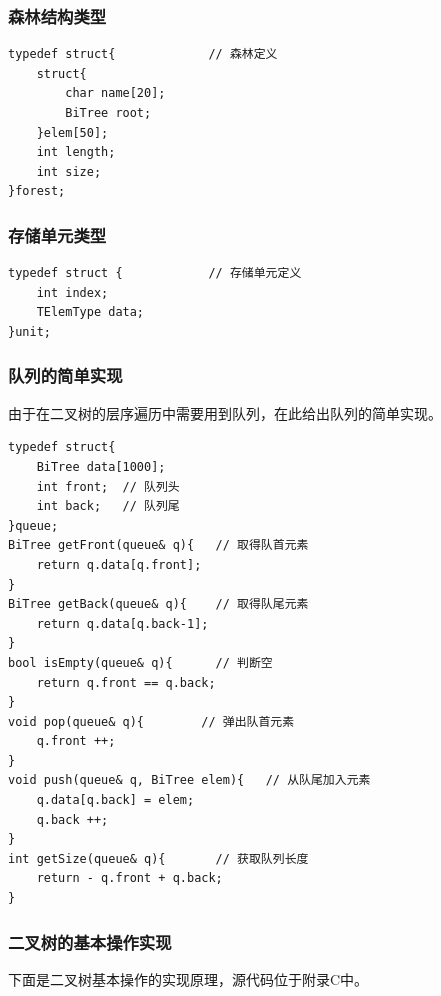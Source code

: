 \documentclass[supercite]{Experimental_Report}
\theoremstyle{definition}
\begin{document}
\subsubsection{森林结构类型}
\begin{verbatim}
typedef struct{         	// 森林定义
    struct{
        char name[20];
        BiTree root;
    }elem[50];
    int length;
    int size;
}forest;
\end{verbatim}

\subsubsection{存储单元类型}
\begin{verbatim}
typedef struct {            // 存储单元定义
    int index;
    TElemType data;
}unit;
\end{verbatim}

\subsubsection{队列的简单实现}
由于在二叉树的层序遍历中需要用到队列，在此给出队列的简单实现。
\begin{verbatim}
typedef struct{
    BiTree data[1000];
    int front;  // 队列头
    int back;   // 队列尾
}queue;
BiTree getFront(queue& q){   // 取得队首元素
    return q.data[q.front];
}
BiTree getBack(queue& q){    // 取得队尾元素
    return q.data[q.back-1];
}
bool isEmpty(queue& q){      // 判断空
    return q.front == q.back;
}
void pop(queue& q){        // 弹出队首元素
    q.front ++;
}
void push(queue& q, BiTree elem){   // 从队尾加入元素
    q.data[q.back] = elem;
    q.back ++;
}
int getSize(queue& q){       // 获取队列长度
    return - q.front + q.back;
}
\end{verbatim}

\subsubsection{二叉树的基本操作实现}
下面是二叉树基本操作的实现原理，源代码位于附录C中。
\end{document}

